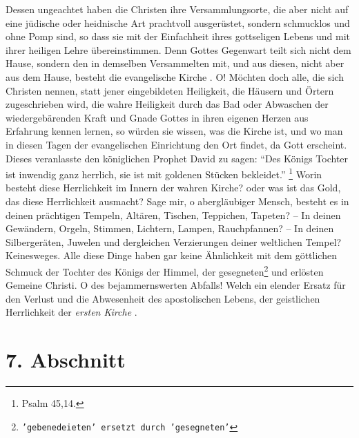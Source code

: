 \medskip

Dessen ungeachtet haben die Christen ihre Versammlungsorte, die aber nicht auf
eine jüdische oder heidnische Art prachtvoll ausgerüstet, sondern schmucklos und
ohne Pomp sind, so dass sie mit der Einfachheit ihres gottseligen Lebens und mit
ihrer heiligen Lehre übereinstimmen. Denn Gottes Gegenwart  teilt sich nicht dem
Hause, sondern den in demselben Versammelten mit, und aus diesen, nicht aber aus
dem Hause, besteht die evangelische Kirche 
. O! Möchten doch alle, die sich
Christen nennen, statt jener eingebildeten Heiligkeit, die Häusern und Örtern
zugeschrieben wird, die wahre Heiligkeit durch das Bad oder Abwaschen der
wiedergebärenden Kraft und Gnade Gottes in ihren eigenen Herzen aus Erfahrung
kennen lernen, so würden sie wissen, was die Kirche ist, und wo man in diesen
Tagen der evangelischen Einrichtung den Ort findet, da Gott erscheint. Dieses
veranlasste den königlichen Prophet David  zu sagen:
"`Des Königs Tochter ist inwendig ganz herrlich, sie ist mit goldenen Stücken
bekleidet."'
\footnote{Psalm 45,14.}
Worin besteht diese Herrlichkeit im Innern der wahren Kirche? oder was
ist das Gold, das diese Herrlichkeit ausmacht? Sage mir, o abergläubiger Mensch,
besteht es in deinen prächtigen Tempeln, Altären, Tischen,
Teppichen, Tapeten?
-- In deinen Gewändern, Orgeln, Stimmen, Lichtern, Lampen,
Rauchpfannen? -- In
deinen Silbergeräten, Juwelen und dergleichen Verzierungen deiner weltlichen
Tempel? Keinesweges. Alle diese Dinge haben gar keine
Ähnlichkeit mit dem
göttlichen Schmuck der Tochter des Königs der Himmel, der gesegneten\footnote{\texttt{'gebenedeieten' ersetzt durch 'gesegneten'}}
und
erlösten Gemeine Christi. O des bejammernswerten Abfalls! Welch ein elender
Ersatz für den Verlust und die Abwesenheit des apostolischen Lebens, der
geistlichen Herrlichkeit der \textit{ersten Kirche} .

\section{7. Abschnitt} \label{kap5_ab7}

